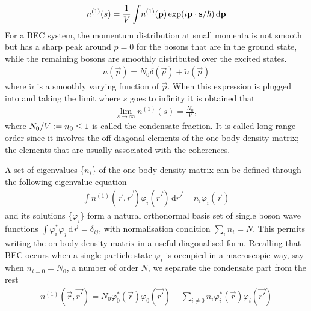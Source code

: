 			\begin{align}
				n^{(1)}(s) = \frac{1}{V}\int \! n^{(1)}\qty(\bm{\mathrm{p}})\exp(i\bm{\mathrm{p}}\cdot\bm{\mathrm{s}}/\hbar)\,\mathrm{d}\bm{\mathrm{p}} \label{eq:one-body-den-mom}
			\end{align}
			For a BEC system, the momentum distribution at small momenta is not smooth but has a sharp peak around $p=0$ for the bosons that are in the ground state, while the remaining bosons are smoothly distributed over the excited states.
			\begin{align}
				n(\vec{p})=N_0\delta(\vec{p})+\tilde{n}(\vec{p})
			\end{align}
			where $\tilde{n}$ is a smoothly varying function of $\vec{p}$. When this expression is plugged into  and taking the limit where $s$ goes to infinity it is obtained that
			\begin{align}
				\lim_{s\rightarrow\infty}n^{(1)}(s)=\frac{N_0}{V},
			\end{align}
			where $N_0/V \vcentcolon= n_0\leq 1$ is called the condensate fraction. It is called long-range order since it involves the off-diagonal elements of the one-body density matrix; the elements that are usually associated with the coherences.
			
			A set of eigenvalues \{$n_i$\} of the one-body density matrix can be defined through the following eigenvalue equation
			\begin{align}
				\int \! n^{(1)}(\vec{r},\vec{r'})\varphi_i(\vec{r'}) \,\mathrm{d}\vec{r'} = n_i\varphi_i(\vec{r})
			\end{align}
			and its solutions \{$\varphi_i$\} form a natural orthonormal basis set of single boson wave functions $\int\!\varphi_i^*\varphi_j\,\mathrm{d}\vec{r}=\delta_{ij}$, with normalisation condition $\sum_i n_i=N$. This permits writing the on-body density matrix in a useful diagonalised form. Recalling that BEC occurs when a single particle state $\varphi_i$ is occupied in a macroscopic way, say when $n_{i=0}=N_0$, a number of order $N$, we separate the condensate part from the rest
			\begin{align}
				n^{(1)}(\vec{r},\vec{r'}) = N_0\varphi_0^*(\vec{r})\varphi_0(\vec{r'})+\sum_{i\neq0}n_i\varphi_i^*(\vec{r})\varphi_i(\vec{r'}) \label{eq:obdm-diag}
			\end{align}

